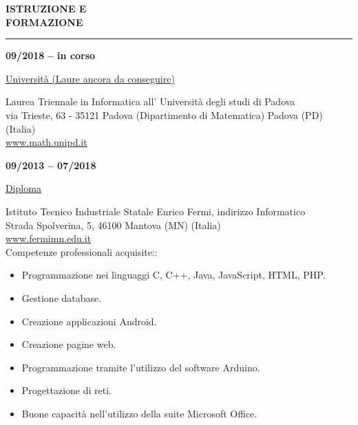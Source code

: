 \begin{minipage}[b]{0.3\textwidth}
	\textbf{ISTRUZIONE E \\FORMAZIONE}
\end{minipage}%
\hfill
\hfill
\begin{minipage}[t]{0.6\textwidth}		
	\rule{\textwidth}{0.4pt}
\end{minipage}%
\vspace{5mm}



\begin{minipage}[t]{0.3\textwidth}
	\textbf{09/2018 – in corso}
\end{minipage}%
\hfill
\hfill
\begin{minipage}[t]{0.6\textwidth}		
	\begin{Large}
		\underline{Università (Laure ancora da conseguire)} \vspace{5mm}\\
	\end{Large}
	Laurea Triennale in Informatica all' Università degli studi di Padova\\
	via Trieste, 63 - 35121 Padova (Dipartimento di Matematica) Padova (PD) (Italia) \\
	\url{www.math.unipd.it} 
	\vspace{4mm}
\end{minipage}%


\begin{minipage}[t]{0.3\textwidth}
	\textbf{09/2013 – 07/2018}
\end{minipage}%
\hfill
\hfill
\begin{minipage}[t]{0.6\textwidth}		
	\begin{Large}
		\underline{Diploma} \vspace{5mm}\\
	\end{Large}
	Istituto Tecnico Industriale Statale Enrico Fermi, indirizzo Informatico\\
	Strada Spolverina, 5, 46100 Mantova (MN) (Italia) \\
	\url{www.fermimn.edu.it} \vspace{1mm}\\
	Competenze professionali acquisite::
	\begin{itemize}
		\item Programmazione nei linguaggi C, C++, Java, JavaScript, HTML, PHP.
		\item Gestione database.
		\item  Creazione applicazioni Android.
		\item Creazione pagine web.
		\item Programmazione tramite l'utilizzo del software Arduino.
		\item  Progettazione di reti.
		\item Buone capacità nell'utilizzo della suite Microsoft Office.
	\end{itemize} 
	\vspace{4mm}
\end{minipage}%